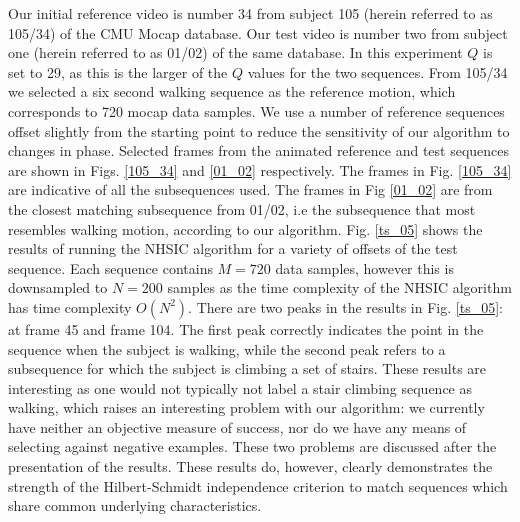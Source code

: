 Our initial reference video is number 34 from subject 105 (herein referred to as 105/34) of the CMU Mocap database. Our test video is number two from subject one (herein referred to as 01/02) of the same database. In this experiment $Q$ is set to 29, as this is the larger of the $Q$ values for the two sequences. From 105/34 we selected a six second walking sequence as the reference motion, which corresponds to 720 mocap data samples. We use a number of reference sequences offset slightly from the starting point to reduce the sensitivity of our algorithm to changes in phase. Selected frames from the animated reference and test sequences are shown in Figs. \ref{105_34} and \ref{01_02} respectively. The frames in Fig. \ref{105_34} are indicative of all the subsequences used. The frames in Fig \ref{01_02} are from the closest matching subsequence from 01/02, i.e the subsequence that most resembles walking motion, according to our algorithm. Fig. \ref{ts_05} shows the results of running the NHSIC algorithm for a variety of offsets of the test sequence. Each sequence contains $M = 720$ data samples, however this is downsampled to $N = 200$ samples as the time complexity of the NHSIC algorithm has time complexity $O(N^2)$. There are two peaks in the results in Fig. \ref{ts_05}: at frame 45 and frame 104. The first peak correctly indicates the point in the sequence when the subject is walking, while the second peak refers to a subsequence for which the subject is climbing a set of stairs. These results are interesting as one would not typically not label a stair climbing sequence as walking, which raises an interesting problem with our algorithm: we currently have neither an objective measure of success, nor do we have any means of selecting against negative examples. These two problems are discussed after the presentation of the results. These results do, however, clearly demonstrates the strength of the Hilbert-Schmidt independence criterion to match sequences which share common underlying characteristics.%

